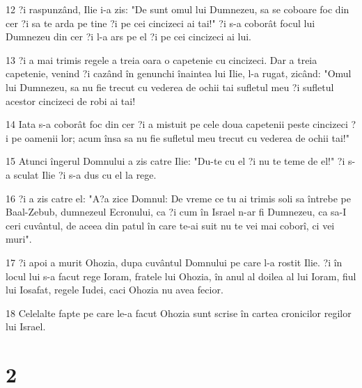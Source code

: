 \par 12 ?i raspunzând, Ilie i-a zis: "De sunt omul lui Dumnezeu, sa se coboare foc din cer ?i sa te arda pe tine ?i pe cei cincizeci ai tai!" ?i s-a coborât focul lui Dumnezeu din cer ?i l-a ars pe el ?i pe cei cincizeci ai lui.
\par 13 ?i a mai trimis regele a treia oara o capetenie cu cincizeci. Dar a treia capetenie, venind ?i cazând în genunchi înaintea lui Ilie, l-a rugat, zicând: "Omul lui Dumnezeu, sa nu fie trecut cu vederea de ochii tai sufletul meu ?i sufletul acestor cincizeci de robi ai tai!
\par 14 Iata s-a coborât foc din cer ?i a mistuit pe cele doua capetenii peste cincizeci ?i pe oamenii lor; acum însa sa nu fie sufletul meu trecut cu vederea de ochii tai!"
\par 15 Atunci îngerul Domnului a zis catre Ilie: "Du-te cu el ?i nu te teme de el!" ?i s-a sculat Ilie ?i s-a dus cu el la rege.
\par 16 ?i a zis catre el: "A?a zice Domnul: De vreme ce tu ai trimis soli sa întrebe pe Baal-Zebub, dumnezeul Ecronului, ca ?i cum în Israel n-ar fi Dumnezeu, ca sa-I ceri cuvântul, de aceea din patul în care te-ai suit nu te vei mai coborî, ci vei muri".
\par 17 ?i apoi a murit Ohozia, dupa cuvântul Domnului pe care l-a rostit Ilie. ?i în locul lui s-a facut rege Ioram, fratele lui Ohozia, în anul al doilea al lui Ioram, fiul lui Iosafat, regele Iudei, caci Ohozia nu avea fecior.
\par 18 Celelalte fapte pe care le-a facut Ohozia sunt scrise în cartea cronicilor regilor lui Israel.

\chapter{2}


